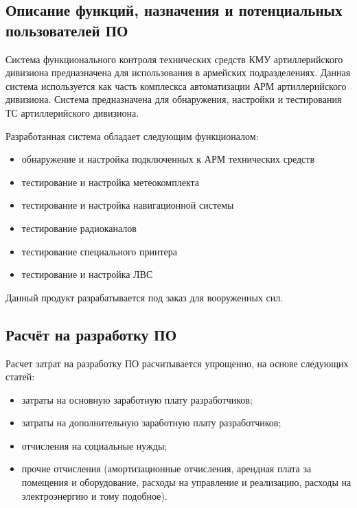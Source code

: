 



\FPround{}



\subsection{Описание функций, назначения и потенциальных пользователей ПО}

Система функционального контроля технических средств КМУ артиллерийского дивизиона предназначена для использования в
армейских подразделениях. Данная система используется как часть комплескса автоматизации АРМ артиллерийского дивизиона.
Система предназначена для обнаружения, настройки и тестирования ТС артиллерийского дивизиона.

Разработанная система обладает следующим функционалом:
\begin{itemize}
		\item обнаружение и настройка подключенных к АРМ технических средств
		\item тестирование и настройка метеокомплекта
		\item тестирование и настройка навигационной системы
		\item тестирование радиоканалов
		\item тестирование специального принтера
		\item тестирование и настройка ЛВС
\end{itemize}

Данный продукт разрабатывается под заказ для вооруженных сил.

\subsection{Расчёт на разработку ПО}

Расчет затрат на разработку ПО расчитывается упрощенно, на основе следующих статей:
\begin{itemize}
	\item затраты на основную заработную плату разработчиков;
	\item затраты на дополнительную заработную плату разработчиков;
	\item отчисления на социальные нужды;
	\item прочие отчисления (амортизационные отчисления, арендная плата за помещения и
		оборудование, расходы на управление и реализацию, расходы на электроэнергию и тому подобное).
\end{itemize}

